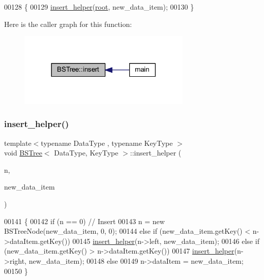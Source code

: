 \begin{DoxyCode}
00128 \{
00129     \hyperlink{class_b_s_tree_a79d1cab6032e8be7484591990249c9d6}{insert\_helper}(\hyperlink{class_b_s_tree_a83534afce9094181ac031f9f596a8625}{root}, new\_data\_item);
00130 \}
\end{DoxyCode}
Here is the caller graph for this function\+:
\nopagebreak
\begin{figure}[H]
\begin{center}
\leavevmode
\includegraphics[width=233pt]{class_b_s_tree_a3136c063de9adf6f55e524ad099df62f_icgraph}
\end{center}
\end{figure}
\hypertarget{class_b_s_tree_a79d1cab6032e8be7484591990249c9d6}{}\label{class_b_s_tree_a79d1cab6032e8be7484591990249c9d6} 
\subsubsection{\texorpdfstring{insert\+\_\+helper()}{insert\_helper()}}
{\footnotesize\ttfamily template$<$typename Data\+Type , typename Key\+Type $>$ \\
void \hyperlink{class_b_s_tree}{B\+S\+Tree}$<$ Data\+Type, Key\+Type $>$\+::insert\+\_\+helper (\begin{DoxyParamCaption}\item[{\hyperlink{class_b_s_tree_1_1_b_s_tree_node}{B\+S\+Tree\+Node} $\ast$\&}]{n,  }\item[{const Data\+Type \&}]{new\+\_\+data\+\_\+item }\end{DoxyParamCaption})\hspace{0.3cm}{\ttfamily [protected]}}


\begin{DoxyCode}
00141 \{
00142     \textcolor{keywordflow}{if} (n == 0) \textcolor{comment}{// Insert}
00143         n = \textcolor{keyword}{new} BSTreeNode(new\_data\_item, 0, 0);
00144     \textcolor{keywordflow}{else} \textcolor{keywordflow}{if} (new\_data\_item.getKey() < n->dataItem.getKey())
00145         \hyperlink{class_b_s_tree_a79d1cab6032e8be7484591990249c9d6}{insert\_helper}(n->left, new\_data\_item);
00146     \textcolor{keywordflow}{else} \textcolor{keywordflow}{if} (new\_data\_item.getKey() > n->dataItem.getKey())
00147         \hyperlink{class_b_s_tree_a79d1cab6032e8be7484591990249c9d6}{insert\_helper}(n->right, new\_data\_item);
00148     \textcolor{keywordflow}{else}
00149         n->dataItem = new\_data\_item;
00150 \}
\end{DoxyCode}
\hypertarget{class_b_s_tree_aa79c2c24f8a4068dd01526674016b861}{}\label{class_b_s_tree_aa79c2c24f8a4068dd01526674016b861} 

